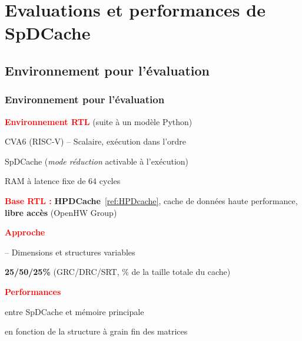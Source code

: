 
\section[Evaluations]{Evaluations et performances de SpDCache}

\subsection{Environnement pour l'évaluation}

\begin{frame}
    \frametitle{Environnement pour l'évaluation}

    \textbf{\textcolor{Red}{Environnement RTL}} (suite à un modèle Python)

     CVA6 (RISC-V) -- Scalaire, exécution dans l'ordre

     SpDCache (\textit{mode réduction} activable à l'exécution)

     RAM à latence fixe de 64 cycles

    \smallskip

    \textbf{\textcolor{Red}{Base RTL :}} \textbf{HPDCache}~\cref{ref:HPDcache}, cache de données haute performance, \textbf{libre accès} (OpenHW Group)


    \bigskip

    \textbf{\textcolor{Red}{Approche}}


     -- Dimensions et structures variables

     \textbf{25/50/25\%} \hfill \textcolor{black!60}{(GRC/DRC/SRT, \% de la taille totale du cache)}


    \bigskip

    \textbf{\textcolor{Red}{Performances}}

     entre SpDCache et mémoire principale

     en fonction de la structure à grain fin des matrices

    \vspace*{12pt}

\end{frame}

